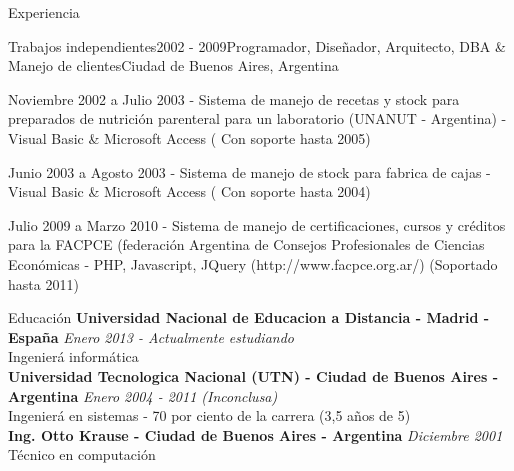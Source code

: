 \documentclass{resume} %
\begin{document}
\begin{rSection}{Experiencia}
\begin{rSubsection}{Trabajos independientes}{2002 - 2009}{Programador, Dise\~nador, Arquitecto, DBA \& Manejo de clientes}{Ciudad de Buenos Aires, Argentina}
\item  Noviembre 2002 a Julio 2003 - Sistema de manejo de recetas y stock para preparados de nutrici\'on parenteral para un laboratorio (UNANUT - Argentina) -  Visual Basic \& Microsoft Access ( Con soporte hasta 2005) 
\item  Junio 2003 a Agosto 2003 - Sistema de manejo de stock para fabrica de cajas  - Visual Basic \& Microsoft Access ( Con soporte hasta 2004) 
\item  Julio 2009 a Marzo 2010 - Sistema de manejo de certificaciones, cursos y cr\'editos para la FACPCE (federaci\'on Argentina de Consejos Profesionales de Ciencias Econ\'omicas -  PHP, Javascript, JQuery (http://www.facpce.org.ar/)  (Soportado hasta 2011)
\end{rSubsection}




\end{rSection}



\begin{rSection}{Educaci\'on}
{\bf Universidad Nacional de Educacion a Distancia  - Madrid - Espa\~na } \hfill {\em Enero 2013 - Actualmente estudiando} \\ 
Ingenier\'a inform\'atica  \\


{\bf Universidad Tecnologica Nacional (UTN) - Ciudad de Buenos Aires - Argentina } \hfill {\em Enero 2004 - 2011 (Inconclusa)} \\ 
Ingenier\'a en sistemas  - 70 por ciento de la carrera  (3,5 a\~nos de 5) \\

{\bf Ing. Otto Krause - Ciudad de Buenos Aires - Argentina} \hfill {\em Diciembre 2001} \\ 
T\'ecnico en computaci\'on \\
\end{rSection}






\end{document}
